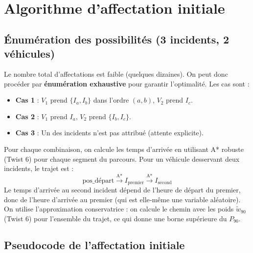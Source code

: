 \documentclass[12pt,a4paper]{article}
\theoremstyle{definition}
\theoremstyle{remark}
\begin{document}
\newpage

\section{Algorithme d’affectation initiale}

\subsection{Énumération des possibilités (3 incidents, 2 véhicules)}

Le nombre total d’affectations est faible (quelques dizaines). On peut
donc procéder par \textbf{énumération exhaustive} pour garantir
l’optimalité. Les cas sont :

\begin{itemize}
  \item \textbf{Cas 1} : $V_1$ prend $\{I_a, I_b\}$ dans l’ordre $(a,b)$,
        $V_2$ prend $I_c$.
  \item \textbf{Cas 2} : $V_1$ prend $I_a$, $V_2$ prend $\{I_b, I_c\}$.
  \item \textbf{Cas 3} : Un des incidents n’est pas attribué (attente
        explicite).
\end{itemize}

Pour chaque combinaison, on calcule les temps d’arrivée en utilisant
A* robuste (Twist 6) pour chaque segment du parcours. Pour un véhicule
desservant deux incidents, le trajet est :
\[
  \text{pos\_départ} \xrightarrow{\text{A*}} I_{\text{premier}}
  \xrightarrow{\text{A*}} I_{\text{second}}
\]
Le temps d’arrivée au second incident dépend de l’heure de départ du
premier, donc de l’heure d’arrivée au premier (qui est elle‑même une
variable aléatoire). On utilise l’approximation conservatrice : on
calcule le chemin avec les poids $\tilde{w}_{90}$ (Twist 6) pour
l’ensemble du trajet, ce qui donne une borne supérieure du $P_{90}$.

\subsection{Pseudocode de l’affectation initiale}
\end{document}
